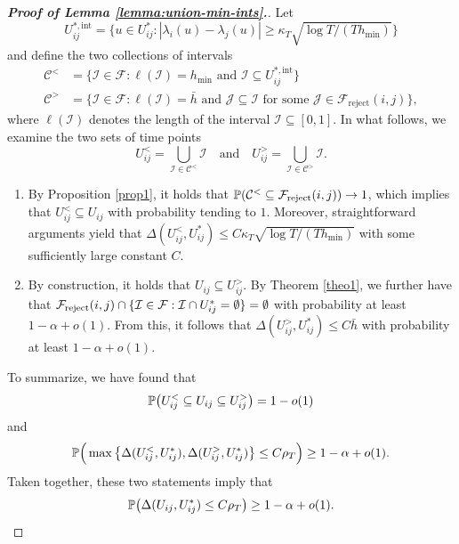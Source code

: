 \documentclass[a4paper,12pt]{article}
\numberwithin{equation}{section}
\begin{document}
{\begin{proof}[\textnormal{\textbf{Proof of Lemma \ref{lemma:union-min-ints}.}}]
Let
\[ U_{ij}^{*,\text{int}} = \Big\{ u \in U_{ij}^*: |\lambda_i(u) - \lambda_j(u)| \ge \kappa_T \sqrt{\log T / (T h_{\min})} \Big\} \]  
and define the two collections of intervals 
\begin{align*}
\mathcal{C}^< & = \big\{ \mathcal{I} \in \mathcal{F}: \ell(\mathcal{I}) = h_{\min} \text{ and } \mathcal{I} \subseteq U_{ij}^{*,\text{int}} \big\} \\
\mathcal{C}^> & = \big\{ \mathcal{I} \in \mathcal{F}: \ell(\mathcal{I}) = \bar{h} \text{ and } \mathcal{J} \subseteq \mathcal{I} \text{ for some } \mathcal{J} \in \mathcal{F}_{\text{reject}}(i,j) \big\},
\end{align*}
where $\ell(\mathcal{I})$ denotes the length of the interval $\mathcal{I} \subseteq [0,1]$. In what follows, we examine the two sets of time points 
\[ U_{ij}^< = \bigcup_{\mathcal{I} \in \mathcal{C}^<} \mathcal{I} \quad \text{and} \quad U_{ij}^> = \bigcup_{\mathcal{I} \in \mathcal{C}^>} \mathcal{I}. \]
\begin{enumerate}[label=(\roman*),leftmargin=0.75cm]
\item By Proposition \ref{prop1}, it holds that $\mathbb{P}(\mathcal{C}^< \subseteq \mathcal{F}_{\text{reject}}(i,j)) \to 1$, which implies that $U_{ij}^< \subseteq U_{ij}$  with probability tending to $1$. Moreover, straightforward arguments yield that $\Delta(U_{ij}^<,U_{ij}^*) \le C \kappa_T \sqrt{\log T / (T h_{\min})}$ with some sufficiently large constant $C$. 
\item By construction, it holds that $U_{ij} \subseteq U_{ij}^>$. By Theorem \ref{theo1}, we further have that $\mathcal{F}_{\text{reject}}(i,j) \cap \{ \mathcal{I} \in \mathcal{F}: \mathcal{I} \cap U_{ij}^* = \emptyset \} = \emptyset$ with probability at least $1-\alpha +o(1)$. From this, it follows that $\Delta(U_{ij}^>,U_{ij}^*) \le C \bar{h}$ with probability at least $1-\alpha + o(1)$.
\end{enumerate}
To summarize, we have found that 
\begin{equation*}
\mathbb{P} \big( U_{ij}^< \subseteq U_{ij} \subseteq U_{ij}^> \big) = 1 - o(1)
\end{equation*}
and 
\begin{equation*}
\mathbb{P} \Big( \max \big\{ \Delta(U_{ij}^<,U_{ij}^*), \Delta(U_{ij}^>,U_{ij}^*) \big\}  \le C \rho_T \Big) \ge 1-\alpha + o(1).
\end{equation*}
Taken together, these two statements imply that 
\[ \mathbb{P} \big( \Delta(U_{ij},U_{ij}^*) \le C \rho_T \big) \ge 1-\alpha + o(1). \qedhere \]
\end{proof}
}
\end{document}
